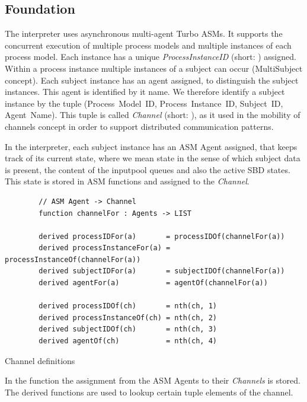 \subsection{Foundation}

The interpreter uses asynchronous multi-agent Turbo ASMs.
It supports the concurrent execution of multiple process models and multiple instances of each process model.
Each instance has a unique \textit{ProcessInstanceID} (short: ) assigned.
Within a process instance multiple instances of a subject can occur (MultiSubject concept).
Each subject instance has an agent assigned, to distinguish the subject instances.
This agent is identified by it name.
We therefore identify a subject instance by the tuple (Process~Model~ID, Process~Instance~ID, Subject~ID, Agent~Name).
This tuple is called \textit{Channel} (short: ), as it used in the mobility of channels concept in order to support distributed communication patterns.

In the interpreter, each subject instance has an ASM Agent assigned, that keeps track of its current state,
where we mean state in the sense of which subject data is present, the content of the inputpool queues and also the active SBD states.
This state is stored in ASM functions and assigned to the \textit{Channel}.

\begin{listing}[H]
	\begin{verbatim}
		// ASM Agent -> Channel
		function channelFor : Agents -> LIST
		
		derived processIDFor(a)       = processIDOf(channelFor(a))
		derived processInstanceFor(a) = processInstanceOf(channelFor(a))
		derived subjectIDFor(a)       = subjectIDOf(channelFor(a))
		derived agentFor(a)           = agentOf(channelFor(a))
		
		derived processIDOf(ch)       = nth(ch, 1)
		derived processInstanceOf(ch) = nth(ch, 2)
		derived subjectIDOf(ch)       = nth(ch, 3)
		derived agentOf(ch)           = nth(ch, 4)
	\end{verbatim}
	\caption{Channel definitions}
	\label{lst:shortasm:channelFor}
\end{listing}

In the function  the assignment from the ASM Agents to their \textit{Channels} is stored.
The derived functions are used to lookup certain tuple elements of the channel.\\


